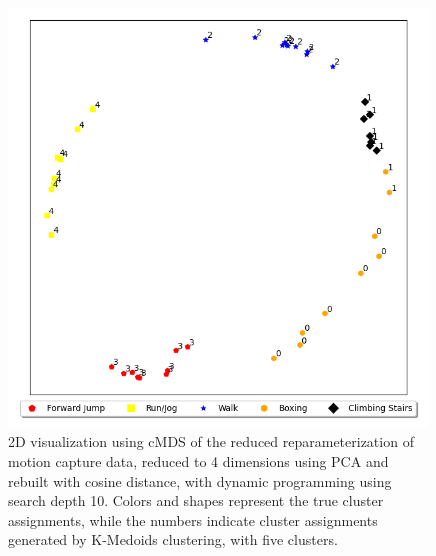 \begin{figure}
    \centering
    \includegraphics[width=0.99\textwidth]{figures/motion-capture-data/2d_plots/reparameterization_depth10_red}
    \caption[2D cMDS Visualization of PCA-Reduced Reparameterized Motion Capture Data (Search Depth 10)]{2D visualization using cMDS of the reduced reparameterization of motion capture data, reduced to 4 dimensions using PCA and rebuilt with cosine distance, with dynamic programming using search depth 10. Colors and shapes represent the true cluster assignments, while the numbers indicate cluster assignments generated by K-Medoids clustering, with five clusters.}
    \label{fig:2d-reparameterization-depth10_reduced}
\end{figure}

